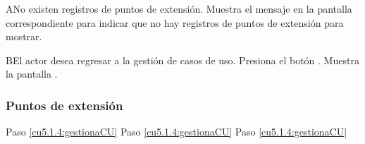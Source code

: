  \begin{UCtrayectoriaA}{A}{No existen registros de puntos de extensión.}
    \UCpaso[\UCsist] Muestra el mensaje  en la pantalla correspondiente
    para indicar que no hay registros de puntos de extensión para mostrar.
 \end{UCtrayectoriaA}
 
 \begin{UCtrayectoriaA}{B}{El actor desea regresar a la gestión de casos de uso.}
    \UCpaso[\UCactor] Presiona el botón .
    \UCpaso[\UCsist] Muestra la pantalla .
 \end{UCtrayectoriaA}

\subsubsection{Puntos de extensión}

	{Paso \ref{cu5.1.4:gestionaCU}}
	{}
	{Paso \ref{cu5.1.4:gestionaCU}}
	{}
	{Paso \ref{cu5.1.4:gestionaCU}}
	{}
  